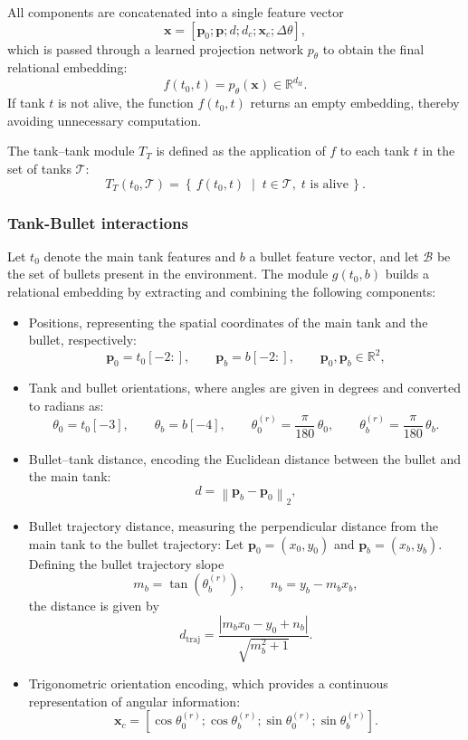 \documentclass[conf]{new-aiaa}
\begin{document}
All components are concatenated into a single feature vector
\[
\mathbf{x}
=
[\mathbf{p}_0;\mathbf{p};d;d_c;\mathbf{x}_{c};\Delta\theta],
\]
which is passed through a learned projection network $p_{\theta}$ to obtain the final relational embedding:
\[
f(t_0, t) = p_{\theta}(\mathbf{x}) \in \mathbb{R}^{d_{tt}}.
\]
If tank $t$ is not alive, the function $f(t_0, t)$ returns an empty embedding, thereby avoiding unnecessary computation.

The tank--tank module $T_T$ is defined as the application of $f$ to each tank $t$ in the set of tanks $\mathcal{T}$:
\[
T_T(t_0, \mathcal{T}) =
\left\{\, f(t_0, t) \;\middle|\; t \in \mathcal{T},\; t \text{ is alive} \,\right\}.
\]

\subsubsection{Tank-Bullet interactions}
Let $t_0$ denote the main tank features and $b$ a bullet feature vector, and let $\mathcal{B}$ be the set of bullets present in the environment. The module $g(t_0,b)$ builds a relational embedding by extracting and combining the following components:

\begin{itemize}
    \item {Positions, representing the spatial coordinates of the main tank and the bullet, respectively:}
    \[
    \mathbf{p}_0 = t_0[-2:], \qquad \mathbf{p}_b = b[-2:], \qquad \mathbf{p}_0,\mathbf{p}_b\in\mathbb{R}^2,
    \]

    \item {Tank and bullet orientations, where angles are given in degrees and converted to radians as:}
    \[
    \theta_0 = t_0[-3], 
    \qquad 
    \theta_b = b[-4],
    \qquad
    \theta_0^{(r)}=\frac{\pi}{180}\,\theta_0,
    \qquad
    \theta_b^{(r)}=\frac{\pi}{180}\,\theta_b.
    \]

    \item {Bullet--tank distance, encoding the Euclidean distance between the bullet and the main tank:}
    \[
    d = \left\lVert \mathbf{p}_b - \mathbf{p}_0 \right\rVert_2,
    \]

    \item {Bullet trajectory distance, measuring the perpendicular distance from the main tank to the bullet trajectory:}
    Let $\mathbf{p}_0=(x_0,y_0)$ and $\mathbf{p}_b=(x_b,y_b)$. Defining the bullet trajectory slope
    \[
    m_b = \tan(\theta_b^{(r)}),
    \qquad
    n_b = y_b - m_b x_b,
    \]
    the distance is given by
    \[
    d_{\text{traj}}
    =
    \frac{\left|m_b x_0 - y_0 + n_b\right|}{\sqrt{m_b^2 + 1}}.
    \]

    \item {Trigonometric orientation encoding, which provides a continuous representation of angular information:}
    \[
    \mathbf{x}_{c}
    =
    [\cos\theta_0^{(r)};\cos\theta_b^{(r)};\sin\theta_0^{(r)};\sin\theta_b^{(r)}].
    \]
\end{itemize}
\end{document}
